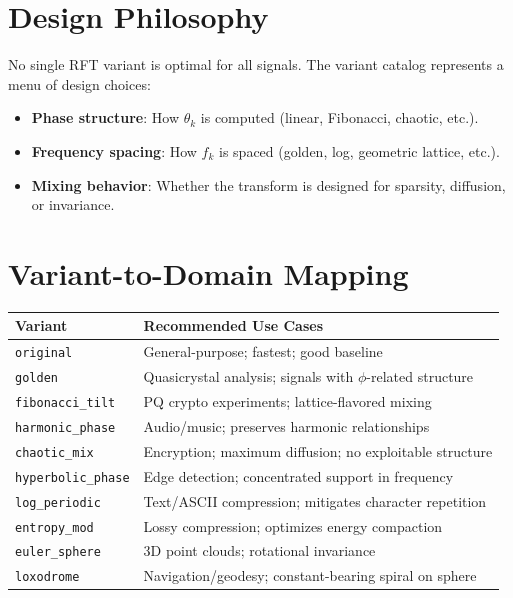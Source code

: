 \documentclass[11pt, a4paper, openany]{book}
\theoremstyle{definition}
\begin{document}
\section{Design Philosophy}
No single RFT variant is optimal for all signals. The variant catalog represents a menu of design choices:
\begin{itemize}
    \item \textbf{Phase structure}: How $\theta_k$ is computed (linear, Fibonacci, chaotic, etc.).
    \item \textbf{Frequency spacing}: How $f_k$ is spaced (golden, log, geometric lattice, etc.).
    \item \textbf{Mixing behavior}: Whether the transform is designed for sparsity, diffusion, or invariance.
\end{itemize}

\section{Variant-to-Domain Mapping}
\begin{table}[h]
\centering
\small
\begin{tabular}{@{}lp{7cm}@{}}\toprule
Variant & Recommended Use Cases \\ \midrule
\texttt{original} & General-purpose; fastest; good baseline \\
\texttt{golden} & Quasicrystal analysis; signals with $\phi$-related structure \\
\texttt{fibonacci\_tilt} & PQ crypto experiments; lattice-flavored mixing \\
\texttt{harmonic\_phase} & Audio/music; preserves harmonic relationships \\
\texttt{chaotic\_mix} & Encryption; maximum diffusion; no exploitable structure \\
\texttt{hyperbolic\_phase} & Edge detection; concentrated support in frequency \\
\texttt{log\_periodic} & Text/ASCII compression; mitigates character repetition \\
\texttt{entropy\_mod} & Lossy compression; optimizes energy compaction \\
\texttt{euler\_sphere} & 3D point clouds; rotational invariance \\
\texttt{loxodrome} & Navigation/geodesy; constant-bearing spiral on sphere \\ \bottomrule
\end{tabular}
\end{table}
\end{document}
